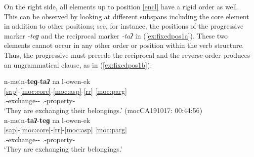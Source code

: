 \documentclass[output=paper]{langscibook}
\begin{document}
\ea
{}

\z
\z

 On the right side, all elements up to position \ref{encl} have a rigid order as well. This can be observed by looking at different subspans including the core element in addition to other positions; see, for instance, the positions of the progressive marker \textit{-teɡ} and the reciprocal marker \textit{-taʔ} in (\ref{ex:fixedpos1a}). These two elements cannot occur in any other order or position within the verb structure. Thus, the progressive must precede the reciprocal and the reverse order produces an ungrammatical clause, as in (\ref{ex:fixedpos1b}). 
 
 \ea\label{ex:fixedpos1}
  \ea\label{ex:fixedpos1a}
    \glll n-meːn-\textbf{teɡ}-\textbf{taʔ} na l-owen-ek\\
    \ref{sap}-\ref{moc:core}-\ref{moc:asp}-\ref{rr} \ref{moc:parg}  \\
     {\Third.\III}-exchange-{\Prog}-{\Recp} {\DetThree} {\Third.\Poss}-property-{\M}\\
    \glt `They are exchanging their belongings.' \hfill (mocCA191017: 00:44:56)\\ 
     \ex\label{ex:fixedpos1b}
     \glll *n-meːn-\textbf{taʔ}-\textbf{teɡ} na l-owen-ek \\
    \ref{sap}-\ref{moc:core}-\ref{rr}-\ref{moc:asp} \ref{moc:parg}  \\
    {\Third.\III}-exchange-{\Prog}-{\Recp} {\DetThree} {\Third.\Poss}-property-{\M}\\
     \glt `They are exchanging their belongings.' \\
    \z
 \z
 
\end{document}
